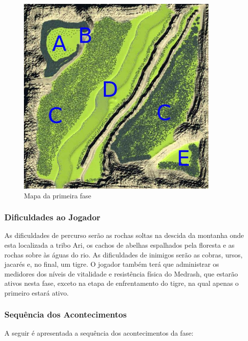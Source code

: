 \begin{figure}[h]
\centering
\includegraphics[width=10cm]{fases_mapa_1.jpg} 
\caption{Mapa da primeira fase}
\label{fig:MapaDaFase1}
\end{figure}

\subsubsection{Dificuldades ao Jogador}

As dificuldades de percurso serão as rochas soltas na descida da montanha onde esta localizada a tribo Ari, os cachos de abelhas espalhados pela floresta e as rochas sobre às águas do rio. As dificuldades de inimigos serão as cobras, ursos, jacarés e, no final, um tigre. O jogador também terá que administrar os medidores dos níveis de vitalidade e resistência física do Medrash, que estarão ativos nesta fase, exceto na etapa de enfrentamento do tigre, na qual apenas o primeiro estará ativo.

\subsubsection{Sequência dos Acontecimentos}

A seguir é apresentada a sequência dos acontecimentos da fase:

